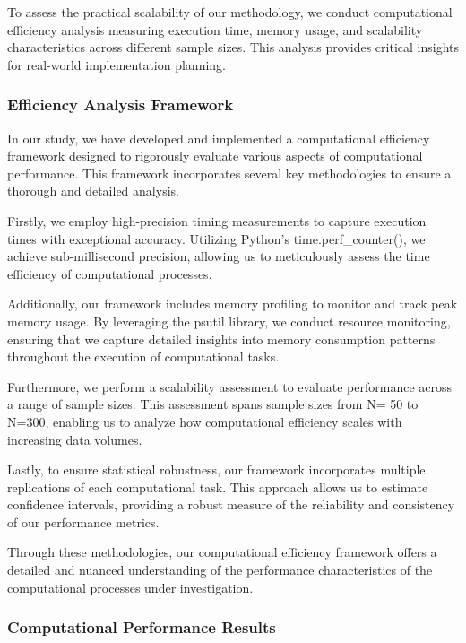 \documentclass[final,3p,fleqn, 10pt]{elsarticle}
\begin{document}
To assess the practical scalability of our methodology, we conduct computational efficiency analysis measuring execution time, memory usage, and scalability characteristics across different sample sizes. This analysis provides critical insights for real-world implementation planning.

\subsubsection{Efficiency Analysis Framework}

In our study, we have developed and implemented a computational efficiency framework designed to rigorously evaluate various aspects of computational performance. This framework incorporates several key methodologies to ensure a thorough and detailed analysis.

Firstly, we employ high-precision timing measurements to capture execution times with exceptional accuracy. Utilizing Python's time.perf\_counter(), we achieve sub-millisecond precision, allowing us to meticulously assess the time efficiency of computational processes.

Additionally, our framework includes memory profiling to monitor and track peak memory usage. By leveraging the psutil library, we conduct resource monitoring, ensuring that we capture detailed insights into memory consumption patterns throughout the execution of computational tasks.

Furthermore, we perform a scalability assessment to evaluate performance across a range of sample sizes. This assessment spans sample sizes from 
N= 50 to N=300, enabling us to analyze how computational efficiency scales with increasing data volumes.

Lastly, to ensure statistical robustness, our framework incorporates multiple replications of each computational task. This approach allows us to estimate confidence intervals, providing a robust measure of the reliability and consistency of our performance metrics.

Through these methodologies, our computational efficiency framework offers a detailed and nuanced understanding of the performance characteristics of the computational processes under investigation.

\subsubsection{Computational Performance Results}
\end{document}
